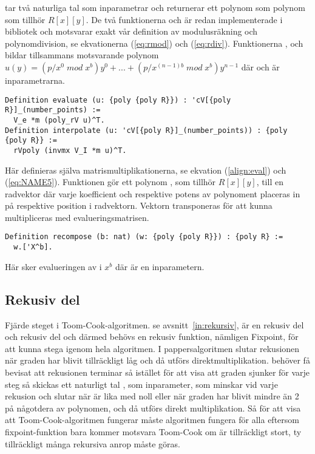  tar två naturliga tal som inparametrar och returnerar ett polynom som
polynom som tillhör $R[x][y]$. De två funktionerna  och  är
redan implementerade i \ssr{} bibliotek och motsvarar exakt vår definition av
modulusräkning och polynomdivision, se ekvationerna (\ref{eq:rmod}) och
(\ref{eq:rdiv}). Funktionerna ,  och  bildar
tillsammans motsvarande polynom
$u(y)=(p/x^0\;mod\;x^b)y^0+...+(p/x^{(n-1)b}\;mod\;x^b)y^{n-1}$ där  och
 är inparametrarna.

\begin{lstlisting}
Definition evaluate (u: {poly {poly R}}) : 'cV[{poly R}]_(number_points) :=
  V_e *m (poly_rV u)^T.
Definition interpolate (u: 'cV[{poly R}]_(number_points)) : {poly {poly R}} :=
  rVpoly (invmx V_I *m u)^T.
\end{lstlisting}

Här definieras själva matrismultiplikationerna, se ekvation (\ref{align:eval})
och (\ref{eq:NAME5}). Funktionen  gör ett polynom , som
tillhör $R[x][y]$, till en radvektor där varje koefficient och respektive
potens av polynoment placeras in på respektive position i radvektorn. Vektorn
transponeras för att kunna multipliceras med evalueringsmatrisen.

\begin{lstlisting}
Definition recompose (b: nat) (w: {poly {poly R}}) : {poly R} :=
  w.['X^b].
\end{lstlisting}

Här sker evalueringen av  i $x^b$ där  är en inparametern.

\subsection{Rekusiv del}

Fjärde steget i Toom-Cook-algoritmen. se avsnitt~\ref{in:rekursiv},  är en rekusiv del och
rekusiv del och därmed behövs en rekusiv funktion, nämligen Fixpoint, för att
kunna stega igenom hela algoritmen. I pappersalgoritmen slutar rekusionen när
graden har blivit tillräckligt låg och då utförs direktmultiplikation. \coq{}
behöver få bevisat att rekusionen terminar så istället för att visa att graden
sjunker för varje steg så skickas ett naturligt tal , som inparameter, som
minskar vid varje rekusion och slutar när  är lika med noll eller när
graden har blivit mindre än 2 på någotdera av polynomen, och då utförs direkt
multiplikation. Så för att visa att Toom-Cook-algoritmen fungerar måste
algoritmen fungera för alla  eftersom fixpoint-funktion bara kommer motsvara
Toom-Cook om  är tillräckligt stort, ty tillräckligt många rekursiva anrop
måste göras.

